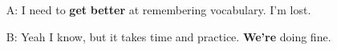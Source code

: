 \begin{itemize}
  \item[A:] I need to \textbf{g\textcolor{fancyorange}{e}t} \textbf{b\textcolor{fancyorange}{e}tter} at remembering vocabulary. I'm lost.
  \item[B:] Yeah I know, but it takes time and practice. \textbf{W\textcolor{fancyorange}{e}'re} doing fine.
\end{itemize}

\newpage






